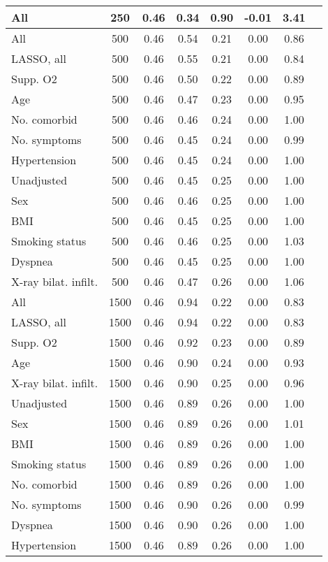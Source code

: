\documentclass{article}
\begin{document}
{\begin{longtable}{lccccccc}
All & 250 & 0.46 & 0.34 & 0.90 & -0.01 & 3.41 \\ \midrule 
All & 500 & 0.46 & 0.54 & 0.21 &  0.00 & 0.86 \\ 
LASSO, all & 500 & 0.46 & 0.55 & 0.21 &  0.00 & 0.84 \\ 
Supp. O2 & 500 & 0.46 & 0.50 & 0.22 &  0.00 & 0.89 \\ 
Age & 500 & 0.46 & 0.47 & 0.23 &  0.00 & 0.95 \\ 
No. comorbid & 500 & 0.46 & 0.46 & 0.24 &  0.00 & 1.00 \\ 
No. symptoms & 500 & 0.46 & 0.45 & 0.24 &  0.00 & 0.99 \\ 
Hypertension & 500 & 0.46 & 0.45 & 0.24 &  0.00 & 1.00 \\ 
Unadjusted & 500 & 0.46 & 0.45 & 0.25 &  0.00 & 1.00 \\ 
Sex & 500 & 0.46 & 0.46 & 0.25 &  0.00 & 1.00 \\ 
BMI & 500 & 0.46 & 0.45 & 0.25 &  0.00 & 1.00 \\ 
Smoking status & 500 & 0.46 & 0.46 & 0.25 &  0.00 & 1.03 \\ 
Dyspnea & 500 & 0.46 & 0.45 & 0.25 &  0.00 & 1.00 \\ 
X-ray bilat. infilt. & 500 & 0.46 & 0.47 & 0.26 &  0.00 & 1.06 \\ \midrule 
All & 1500 & 0.46 & 0.94 & 0.22 &  0.00 & 0.83 \\ 
LASSO, all & 1500 & 0.46 & 0.94 & 0.22 &  0.00 & 0.83 \\ 
Supp. O2 & 1500 & 0.46 & 0.92 & 0.23 &  0.00 & 0.89 \\ 
Age & 1500 & 0.46 & 0.90 & 0.24 &  0.00 & 0.93 \\ 
X-ray bilat. infilt. & 1500 & 0.46 & 0.90 & 0.25 &  0.00 & 0.96 \\ 
Unadjusted & 1500 & 0.46 & 0.89 & 0.26 &  0.00 & 1.00 \\ 
Sex & 1500 & 0.46 & 0.89 & 0.26 &  0.00 & 1.01 \\ 
BMI & 1500 & 0.46 & 0.89 & 0.26 &  0.00 & 1.00 \\ 
Smoking status & 1500 & 0.46 & 0.89 & 0.26 &  0.00 & 1.00 \\ 
No. comorbid & 1500 & 0.46 & 0.89 & 0.26 &  0.00 & 1.00 \\ 
No. symptoms & 1500 & 0.46 & 0.90 & 0.26 &  0.00 & 0.99 \\ 
Dyspnea & 1500 & 0.46 & 0.90 & 0.26 &  0.00 & 1.00 \\ 
Hypertension & 1500 & 0.46 & 0.89 & 0.26 &  0.00 & 1.00 \\
\bottomrule
\hline
\end{longtable}
}
\end{document}
